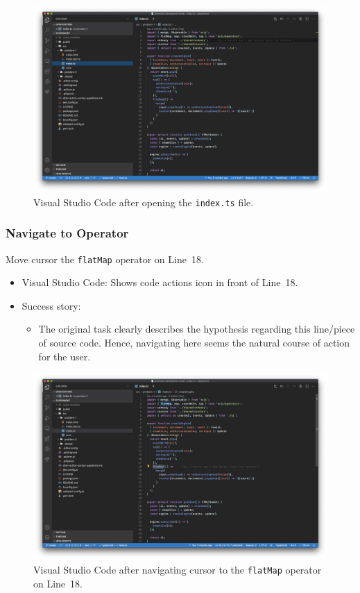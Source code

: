 \documentclass[sigplan,screen,nonacm,review]{acmart}
\begin{document}
\begin{figure}[ht]
	\centering
	\includegraphics[width=\columnwidth]{walkthrough-screenshots/step1.png}
	\Description{}
	\caption{Visual Studio Code after opening the \texttt{index.ts} file.}
	\label{fig:walkthrough-screesnhot-step-1}
\end{figure}


\subsubsection{Navigate to Operator}
Move cursor the \texttt{flatMap} operator on Line~18.

\begin{itemize}
	\item Visual Studio Code: Shows code actions icon in front of Line~18.
	\item Success story:
	      \begin{itemize}
	      	\item The original task clearly describes the hypothesis regarding this line/piece of source code. Hence, navigating here seems the natural course of action for the user.
	      \end{itemize}
\end{itemize}

\begin{figure}[ht]
	\centering
	\includegraphics[width=\columnwidth]{walkthrough-screenshots/step2.png}
	\Description{}
	\caption{Visual Studio Code after navigating cursor to the \texttt{flatMap} operator on Line~18.}
	\label{fig:walkthrough-screesnhot-step-2}
\end{figure}
\end{document}
